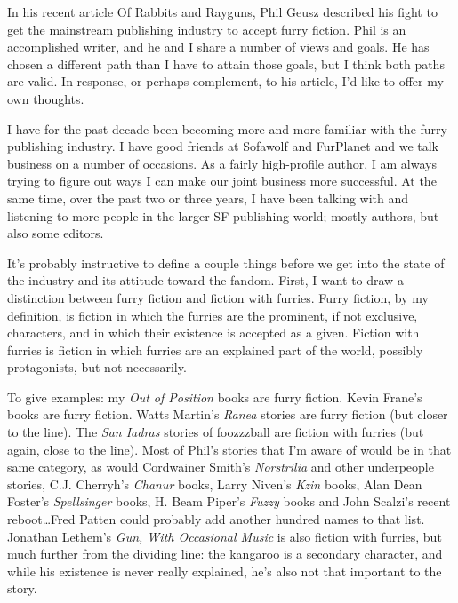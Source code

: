
In his recent article Of Rabbits and Rayguns, Phil Geusz described his fight to get the mainstream publishing industry to accept furry fiction. Phil is an accomplished writer, and he and I share a number of views and goals. He has chosen a different path than I have to attain those goals, but I think both paths are valid. In response, or perhaps complement, to his article, I'd like to offer my own thoughts.

I have for the past decade been becoming more and more familiar with the furry publishing industry. I have good friends at Sofawolf and FurPlanet and we talk business on a number of occasions. As a fairly high-profile author, I am always trying to figure out ways I can make our joint business more successful. At the same time, over the past two or three years, I have been talking with and listening to more people in the larger SF publishing world; mostly authors, but also some editors.

It's probably instructive to define a couple things before we get into the state of the industry and its attitude toward the fandom. First, I want to draw a distinction between furry fiction and fiction with furries. Furry fiction, by my definition, is fiction in which the furries are the prominent, if not exclusive, characters, and in which their existence is accepted as a given. Fiction with furries is fiction in which furries are an explained part of the world, possibly protagonists, but not necessarily.

To give examples: my \textit{Out of Position} books are furry fiction. Kevin Frane's books are furry fiction. Watts Martin's \textit{Ranea} stories are furry fiction (but closer to the line). The \textit{San Iadras} stories of foozzzball are fiction with furries (but again, close to the line). Most of Phil's stories that I'm aware of would be in that same category, as would Cordwainer Smith's \textit{Norstrilia} and other underpeople stories, C.J. Cherryh's \textit{Chanur} books, Larry Niven's \textit{Kzin} books, Alan Dean Foster's \textit{Spellsinger} books, H. Beam Piper's \textit{Fuzzy} books and John Scalzi's recent reboot\ldots Fred Patten could probably add another hundred names to that list. Jonathan Lethem's \textit{Gun, With Occasional Music} is also fiction with furries, but much further from the dividing line: the kangaroo is a secondary character, and while his existence is never really explained, he's also not that important to the story.


